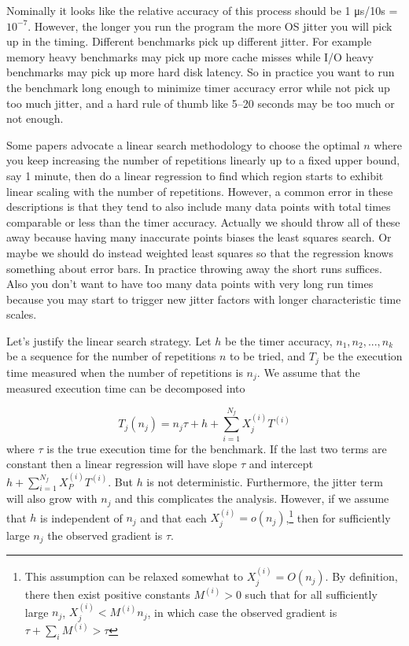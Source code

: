 \documentclass[conference]{IEEEtran}
\begin{document}
Nominally it looks like the relative accuracy of this process should be 1 μs/10s = $10^{-7}$. However, the longer you run the program the more OS jitter you will pick up in the timing. Different benchmarks pick up different jitter. For example memory heavy benchmarks may pick up more cache misses while I/O heavy benchmarks may pick up more hard disk latency. So in practice you want to run the benchmark long enough to minimize timer accuracy error while not pick up too much jitter, and a hard rule of thumb like 5--20 seconds may be too much or not enough.

Some papers
advocate a linear search methodology to choose the optimal $n$ where you keep increasing the number of repetitions linearly up to a fixed upper bound, say 1 minute, then do a linear regression to find which region starts to exhibit linear scaling with the number of repetitions. However, a common error in these descriptions is that they tend to also include many data points with total times comparable or less than the timer accuracy. Actually we should throw all of these away because having many inaccurate points biases the least squares search. Or maybe we should do instead weighted least squares so that the regression knows something about error bars. In practice throwing away the short runs suffices. Also you don't want to have too many data points with very long run times because you may start to trigger new jitter factors with longer characteristic time scales.

Let's justify the linear search strategy. Let $h$ be the timer accuracy, $n_1, n_2, ..., n_k$ be a sequence for the number of repetitions $n$ to be tried, and $T_j$ be the execution time measured when the number of repetitions is $n_j$. We assume that the measured execution time can be decomposed into

\begin{equation}
    T_j(n_j) = n_j \tau + h + \sum_{i=1}^{N_f} X_j^{(i)} T^{(i)}
\end{equation}
%
where $\tau$ is the true execution time for the benchmark. If the last two terms
are constant then a linear regression will have slope $\tau$ and intercept $h + \sum_{i=1}^{N_f} X_P^{(i)} T^{(i)}$. But $h$ is not deterministic. Furthermore, the jitter term will also grow with $n_j$ and this complicates the analysis.
However, if we assume that $h$ is independent of $n_j$ and that each $X_j^{(i)} = o(n_j)$,\footnote{This assumption can be relaxed somewhat to $X_j^{(i)} = O(n_j)$. By definition, there then exist positive constants $M^{(i)} > 0$ such that for all sufficiently large $n_j$, $X_j^{(i)} < M^{(i)} n_j$, in which case the observed gradient is $\tau + \sum_i M^{(i)} > \tau$ } then for sufficiently large $n_j$ the observed gradient is $\tau$.
\end{document}
